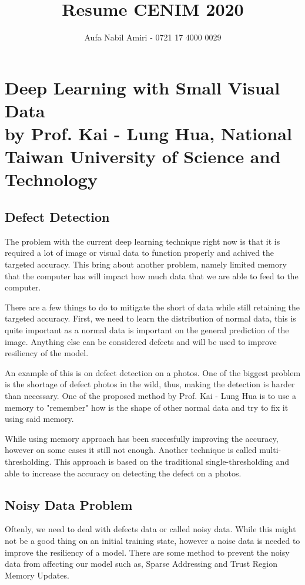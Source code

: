 \documentclass[12pt, a4paper]{article}
\title{Resume CENIM 2020}
\author{Aufa Nabil Amiri - 0721 17 4000 0029}
\date{}
\makeatletter
\renewcommand{\maketitle}{
    \bgroup\setlength{\parindent}{0pt}
    \begin{flushleft}
        \LARGE\textbf{\@title}

        \normalsize\@author
    \end{flushleft}\egroup
}
\makeatother
\begin{document}
\maketitle

\section*{Deep Learning with Small Visual Data \\
  \footnotesize by Prof. Kai - Lung Hua, National Taiwan University of Science and Technology}

\subsection*{Defect Detection}

The problem with the current deep learning technique right now is that it is required a lot of image or visual data to function properly and achived the targeted accuracy. This bring about another problem, namely limited memory that the computer has will impact how much data that we are able to feed to the computer.

There are a few things to do to mitigate the short of data while still retaining the targeted accuracy. First, we need to learn the distribution of normal data, this is quite important as a normal data is important on the general prediction of the image. Anything else can be considered defects and will be used to improve resiliency of the model.

An example of this is on defect detection on a photos. One of the biggest problem is the shortage of defect photos in the wild, thus, making the detection is harder than necessary. One of the proposed method by Prof. Kai - Lung Hua is to use a memory to "remember" how is the shape of other normal data and try to fix it using said memory.

While using memory approach has been succesfully improving the accuracy, however on some cases it still not enough. Another technique is called multi-thresholding. This approach is based on the traditional single-thresholding and able to increase the accuracy on detecting the defect on a photos.

\subsection*{Noisy Data Problem}

Oftenly, we need to deal with defects data or called noisy data. While this might not be a good thing on an initial training state, however a noise data is needed to improve the resiliency of a model. There are some method to prevent the noisy data from affecting our model such as, Sparse Addressing and Trust Region Memory Updates.
\end{document}
